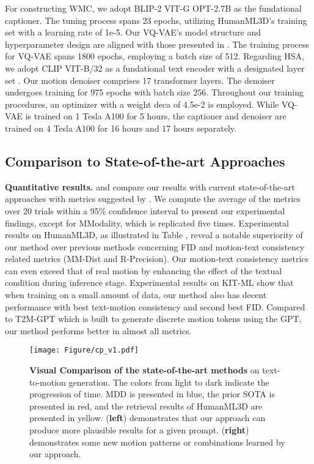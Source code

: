 \documentclass[letterpaper]{article} \usepackage{aaai24}
\begin{document}
For constructing WMC, we adopt BLIP-2 VIT-G OPT-2.7B as the fundational captioner. The tuning process spans 23 epochs, utilizing HumanML3D's training set with a learning rate of 1e-5. Our VQ-VAE's model structure and hyperparameter design are aligned with those presented in \cite{zhang2023t2mgpt}. The training process for VQ-VAE spans 1800 epochs, employing a batch size of 512. Regarding HSA, we adopt CLIP VIT-B/32 as a fundational text encoder with a designated layer set . Our motion denoiser comprises 17 transformer layers. The denoiser undergoes training for 975 epochs with batch size 256. Throughout our training procedures, an optimizer with a weight deca of 4.5e-2 is employed. While VQ-VAE is trained on 1 Tesla A100 for 5 hours, the captioner and denoiser are trained on 4 Tesla A100 for 16 hours and 17 hours separately.




\subsection{Comparison to State-of-the-art Approaches}

\textbf{Quantitative results.}  and  compare our results with current state-of-the-art approaches \cite{guo2022tm2t,guo2022generating,tevet2022human,zhang2022motiondiffuse, chen2023executing,zhang2023t2mgpt} with metrics suggested by \cite{guo2022generating}. We compute the average of the metrics over 20 trials within a 95\% confidence interval to present our experimental findings, except for MModality, which is replicated five times. Experimental results on HumanML3D, as illustrated in Table , reveal a notable superiority of our method over previous methods concerning FID and  motion-text consistency related metrics (MM-Dist and R-Precision). Our motion-text consistency metrics can even exceed that of real motion by enhancing the effect of the textual condition during inference stage. Experimental results on KIT-ML  show that when training on a small amount of data, our method also has decent performance with best text-motion consistency and second best FID. Compared to T2M-GPT which is built to generate discrete motion tokens using the GPT, our method performs better in almost all metrics.

\begin{figure*}[t] 
	\centering 
	\texttt{[image: Figure/cp\_v1.pdf]} 
	\caption{\textbf{Visual Comparison of the state-of-the-art methods} on text-to-motion generation. The colors from light to dark indicate the progression of time. MDD is presented in blue, the prior SOTA is presented in red, and the retrieval results of HumanML3D are presented in yellow. (\textbf{left}) demonstrates that our approach can produce more plausible results for a given prompt. (\textbf{right}) demonstrates some new motion patterns or combinations learned by our approach.}
	\label{Fig:visual} 
\end{figure*}
\end{document}
